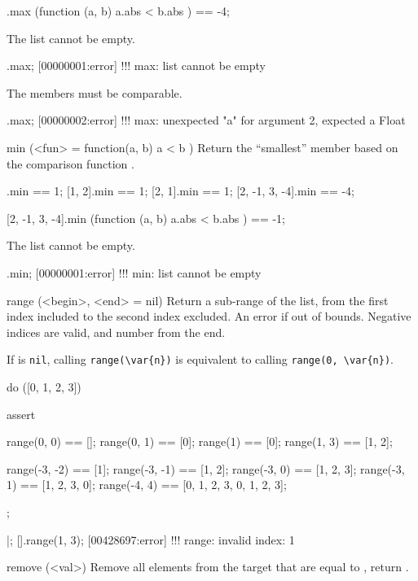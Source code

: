 \begin{urbiscriptapi}
\begin{urbiassert}
[2, -1, 3, -4].max (function (a, b) { a.abs < b.abs }) == -4;
\end{urbiassert}

The list cannot be empty.

\begin{urbiscript}
[].max;
[00000001:error] !!! max: list cannot be empty
\end{urbiscript}

The members must be comparable.
\begin{urbiscript}
[0, 2, "a", 1].max;
[00000002:error] !!! max: unexpected "a" for argument 2, expected a Float
\end{urbiscript}

\item[min](<fun> = function(a, b) { a < b })%
  Return the ``smallest'' member based on the comparison function .
\begin{urbiassert}
           [1].min == 1;
        [1, 2].min == 1;
        [2, 1].min == 1;
[2, -1, 3, -4].min == -4;

[2, -1, 3, -4].min (function (a, b) { a.abs < b.abs }) == -1;
\end{urbiassert}

The list cannot be empty.

\begin{urbiscript}
[].min;
[00000001:error] !!! min: list cannot be empty
\end{urbiscript}

\item[range](<begin>, <end> = nil)%
  Return a sub-range of the list, from the first index included to the
  second index excluded.  An error if out of bounds.  Negative indices
  are valid, and number from the end.

  If  is \lstinline|nil|, calling \lstinline|range(\var{n})|
  is equivalent to calling \lstinline|range(0, \var{n})|.

\begin{urbiscript}
do ([0, 1, 2, 3])
{
  assert
  {
    range(0, 0)   == [];
    range(0, 1)   == [0];
    range(1)      == [0];
    range(1, 3)   == [1, 2];

    range(-3, -2) == [1];
    range(-3, -1) == [1, 2];
    range(-3, 0)  == [1, 2, 3];
    range(-3, 1)  == [1, 2, 3, 0];
    range(-4, 4)  == [0, 1, 2, 3, 0, 1, 2, 3];
  };
}|;
[].range(1, 3);
[00428697:error] !!! range: invalid index: 1
\end{urbiscript}

\item[remove](<val>)%
  Remove all elements from the target that are equal to , return
  \this.


\end{urbiscriptapi}
